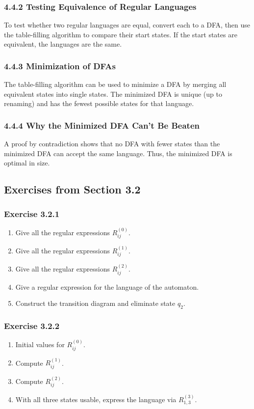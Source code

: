 \documentclass{article}
\begin{document}
\subsubsection*{4.4.2 Testing Equivalence of Regular Languages}
To test whether two regular languages are equal, convert each to a DFA, then use the table-filling algorithm to compare their start states. If the start states are equivalent, the languages are the same.

\subsubsection*{4.4.3 Minimization of DFAs}
The table-filling algorithm can be used to minimize a DFA by merging all equivalent states into single states. The minimized DFA is unique (up to renaming) and has the fewest possible states for that language.

\subsubsection*{4.4.4 Why the Minimized DFA Can’t Be Beaten}
A proof by contradiction shows that no DFA with fewer states than the minimized DFA can accept the same language. Thus, the minimized DFA is optimal in size.

\subsection{Exercises from Section 3.2}

\subsubsection*{Exercise 3.2.1}
\begin{enumerate}[label=\alph*)]
  \item Give all the regular expressions \(R^{(0)}_{ij}\).  
  \item Give all the regular expressions \(R^{(1)}_{ij}\).  
  \item Give all the regular expressions \(R^{(2)}_{ij}\).  
  \item Give a regular expression for the language of the automaton.  
  \item Construct the transition diagram and eliminate state \(q_2\).  
\end{enumerate}

\subsubsection*{Exercise 3.2.2}
\begin{enumerate}[label=\alph*)]
  \item Initial values for \(R^{(0)}_{ij}\).  
  \item Compute \(R^{(1)}_{ij}\).  
  \item Compute \(R^{(2)}_{ij}\).  
  \item With all three states usable, express the language via \(R^{(3)}_{1,3}\).  
\end{enumerate}
\end{document}
